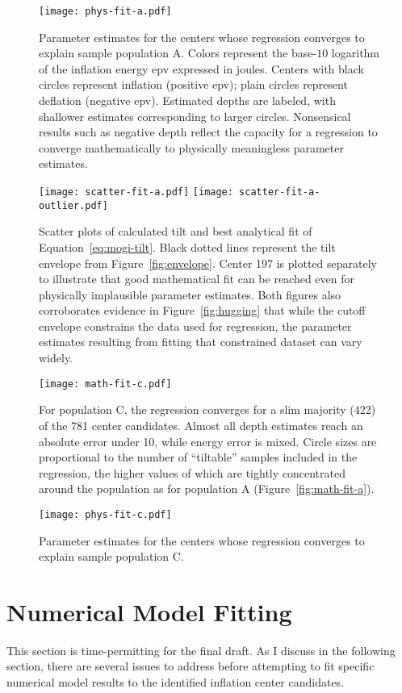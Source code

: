 \begin{figure}
    \texttt{[image: phys-fit-a.pdf]}%
    \caption[Population A: parameter estimates]{Parameter estimates for the centers whose regression converges to explain sample population A. Colors represent the base-$10$ logarithm of the inflation energy \acs{epv} expressed in joules. Centers with black circles represent inflation (positive \acs{epv}); plain circles represent deflation (negative \acs{epv}). Estimated depths are labeled, with shallower estimates corresponding to larger circles. Nonsensical results such as negative depth reflect the capacity for a regression to converge mathematically to physically meaningless parameter estimates.}%
    \label{fig:phys-fit-a}
\end{figure}

\begin{figure}
    \texttt{[image: scatter-fit-a.pdf]}
    \texttt{[image: scatter-fit-a-outlier.pdf]}
    \caption[Population A: scatter Plots \& analytical fit]{Scatter plots of calculated tilt and best analytical fit of Equation~\eqref{eq:mogi-tilt}. Black dotted lines represent the tilt envelope from Figure~\ref{fig:envelope}. Center 197 is plotted separately to illustrate that good mathematical fit can be reached even for physically implausible parameter estimates. Both figures also corroborates evidence in Figure~\ref{fig:hugging} that while the cutoff envelope constrains the data used for regression, the parameter estimates resulting from fitting that constrained dataset can vary widely.}%
    \label{fig:scatter-fit-a}
\end{figure}

\begin{figure}
    \texttt{[image: math-fit-c.pdf]}
    \caption[Population C: goodness of fit]{For population C, the regression converges for a slim majority (422) of the 781 center candidates. Almost all depth estimates reach an absolute error under 10, while energy error is mixed. Circle sizes are proportional to the number of ``tiltable'' samples included in the regression, the higher values of which are tightly concentrated around the population as for population A (Figure~\ref{fig:math-fit-a}).}%
    \label{fig:math-fit-c}
\end{figure}

\begin{figure}
    \texttt{[image: phys-fit-c.pdf]}%
    \caption[Population C: parameter estimates]{Parameter estimates for the centers whose regression converges to explain sample population C.}%
    \label{fig:phys-fit-c}
\end{figure}


\section{Numerical Model Fitting}

This section is time-permitting for the final draft. As I discuss in the following section, there are several issues to address before attempting to fit specific numerical model results to the identified inflation center candidates.